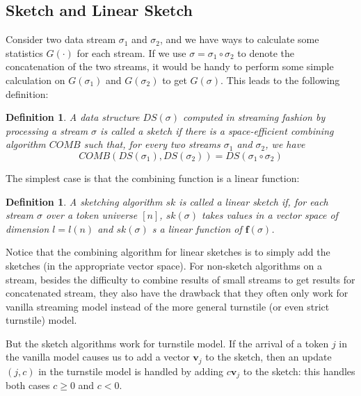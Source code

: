 \documentclass[11pt]{article}
\theoremstyle{plain}
\newtheorem{definition}[theorem]{Definition}
\begin{document}
\subsection{Sketch and Linear Sketch}
\label{s:sketch}
Consider two data stream $\sigma_1$ and  $\sigma_2$, and we have ways to 
calculate some statistics $G(\cdot)$ for each stream. If we use $\sigma = 
\sigma_1\circ\sigma_2$ to denote the concatenation of the two streams, it 
would be handy to perform some simple calculation on $G(\sigma_1)$ and 
$G(\sigma_2)$ to get $G(\sigma)$. This leads to the following definition:

\begin{definition}
A data structure $DS(\sigma)$ computed in streaming fashion by processing 
a stream $\sigma$ is called a sketch if there is a space-efficient combining 
algorithm $COMB$ such that, for every two streams $\sigma_1$ and  
$\sigma_2$, we have
\[
COMB(DS(\sigma_1), DS(\sigma_2))=DS(\sigma_1\circ\sigma_2)
\]
\end{definition}
The simplest case is that the combining function is a linear function:

\begin{definition}
A sketching algorithm $sk$ is called a linear sketch if, for each stream 
$\sigma$ over a token universe $[n]$, $sk(\sigma)$ takes values in a vector 
space of dimension $l=l(n)$ and $sk(\sigma)$ s a linear function of 
$\textbf{f}(\sigma)$. 
\end{definition}
Notice that the combining algorithm for linear sketches is to simply add the 
sketches (in the appropriate vector space). For non-sketch algorithms on a 
stream, besides the difficulty to combine results of small streams to get 
results for concatenated stream, they also have the drawback that they often 
only work for vanilla streaming model instead of the more general turnstile
(or even strict turnstile) model. 

But the sketch algorithms work for turnstile model. If the arrival of a token 
$j$ in the vanilla model causes us to add a vector $\textbf{v}_j$ to the 
sketch, then an update $(j,c)$ in the turnstile model is handled by adding 
$c\textbf{v}_j$ to the sketch: this handles both cases $c\geq0$ and $c<0$.
\end{document}
